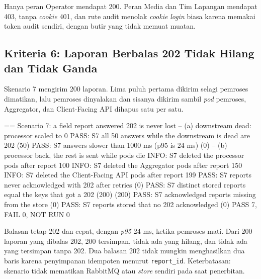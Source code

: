 Hanya peran Operator mendapat 200. Peran Media dan Tim Lapangan mendapat 403, tanpa \textit{cookie} 401, dan rute audit menolak \textit{cookie} \textit{login} biasa karena memakai token audit sendiri, dengan butir yang tidak memuat muatan.

\subsection{Kriteria 6: Laporan Berbalas 202 Tidak Hilang dan Tidak Ganda}

Skenario 7 mengirim 200 laporan. Lima puluh pertama dikirim selagi pemroses dimatikan, lalu pemroses dinyalakan dan sisanya dikirim sambil \textit{pod} pemroses, Aggregator, dan Client-Facing API dihapus satu per satu.

\begin{codebox}
== Scenario 7: a field report answered 202 is never lost
-- (a) downstream dead: processor scaled to 0
PASS: S7 all 50 answers while the downstream is dead are 202 (50)
PASS: S7 answers slower than 1000 ms (p95 is 24 ms) (0)
-- (b) processor back, the rest is sent while pods die
INFO: S7 deleted the processor pods after report 100
INFO: S7 deleted the Aggregator pods after report 150
INFO: S7 deleted the Client-Facing API pods after report 199
PASS: S7 reports never acknowledged with 202 after retries (0)
PASS: S7 distinct stored reports equal the keys that got a 202 (200) (200)
PASS: S7 acknowledged reports missing from the store (0)
PASS: S7 reports stored that no 202 acknowledged (0)
PASS 7, FAIL 0, NOT RUN 0
\end{codebox}

Balasan tetap 202 dan cepat, dengan \textit{p95} 24 ms, ketika pemroses mati. Dari 200 laporan yang dibalas 202, 200 tersimpan, tidak ada yang hilang, dan tidak ada yang tersimpan tanpa 202. Dua balasan 202 tidak mungkin menghasilkan dua baris karena penyimpanan idempoten menurut \texttt{report\_id}. Keterbatasan: skenario tidak mematikan RabbitMQ atau \textit{store} sendiri pada saat penerbitan.
